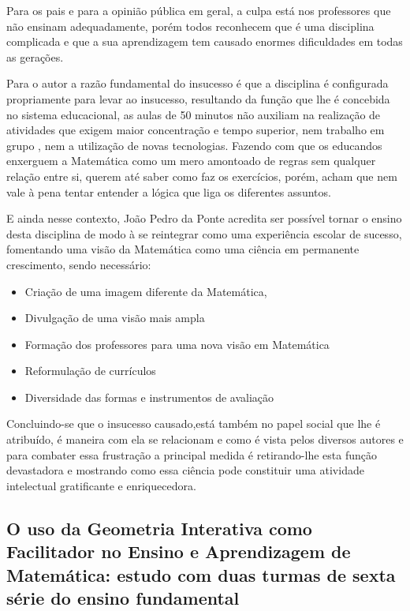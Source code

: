 \documentclass[12pt,a4paper]{article}
\begin{document}
Para os pais e para a opinião pública em geral, a culpa está nos professores que não ensinam adequadamente, porém todos reconhecem que é uma disciplina complicada e que a sua aprendizagem tem causado enormes dificuldades em todas as gerações. 

Para o autor a razão fundamental do insucesso é que a disciplina é configurada propriamente para levar ao insucesso, resultando da função que lhe é concebida no sistema educacional, as aulas de 50 minutos não auxiliam na realização de atividades que exigem maior concentração e tempo superior, nem trabalho em grupo , nem a utilização de novas tecnologias. Fazendo com que os educandos enxerguem a Matemática como um mero amontoado de regras sem qualquer relação entre si, querem até saber como faz os exercícios, porém, acham que nem vale à pena tentar entender a lógica que liga os diferentes assuntos. 

E ainda nesse contexto, João Pedro da Ponte acredita ser possível tornar o ensino desta disciplina de modo à se reintegrar como uma experiência escolar de sucesso, fomentando uma visão da Matemática como uma ciência em permanente crescimento, sendo necessário: 

\begin{itemize}
	\item Criação de uma imagem diferente da Matemática,
	\item Divulgação de uma visão mais ampla 
	\item Formação dos professores para uma nova visão em Matemática 
	\item Reformulação de currículos 
	\item Diversidade das formas e instrumentos de avaliação 
\end{itemize}

Concluindo-se que o insucesso causado,está também no papel social que lhe é atribuído, é maneira com ela se relacionam e como é vista pelos diversos autores e para combater essa frustração a principal medida é retirando-lhe esta função devastadora e mostrando como essa ciência pode constituir uma atividade intelectual gratificante e enriquecedora. \citep{pedro1994}

\subsection{O uso da Geometria Interativa como Facilitador no Ensino e Aprendizagem de Matemática: 
estudo com duas turmas de sexta série do ensino fundamental}
\end{document}
